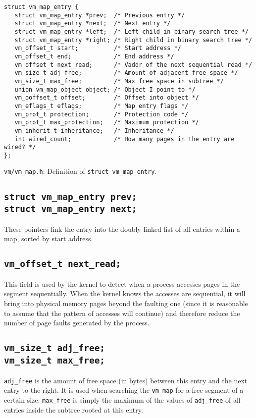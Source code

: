\documentclass[shortabstract, english]{iithesis}
\begin{document}
\begin{listing}[H]
\begin{verbatim}
struct vm_map_entry {
   struct vm_map_entry *prev;  /* Previous entry */
   struct vm_map_entry *next;  /* Next entry */
   struct vm_map_entry *left;  /* Left child in binary search tree */
   struct vm_map_entry *right; /* Right child in binary search tree */
   vm_offset_t start;          /* Start address */
   vm_offset_t end;            /* End address */
   vm_offset_t next_read;      /* Vaddr of the next sequential read */
   vm_size_t adj_free;         /* Amount of adjacent free space */
   vm_size_t max_free;         /* Max free space in subtree */
   union vm_map_object object; /* Object I point to */
   vm_ooffset_t offset;        /* Offset into object */
   vm_eflags_t eflags;         /* Map entry flags */
   vm_prot_t protection;       /* Protection code */
   vm_prot_t max_protection;   /* Maximum protection */
   vm_inherit_t inheritance;   /* Inheritance */
   int wired_count;            /* How many pages in the entry are wired? */
};
\end{verbatim}
\caption{\texttt{vm/vm\_map.h}: Definition of \texttt{struct vm_map_entry}.}
\end{listing}

\subsection*{\texttt{struct vm_map_entry prev;}\\
  \texttt{struct vm_map_entry next;}}
These pointers link the entry into the doubly linked list of all entries within
a map, sorted by start address.

\subsection*{\texttt{vm_offset_t next_read;}}
This field is used by the kernel to detect when a process accesses pages in the
segment sequentially. When the kernel knows the accesses are sequential, it will
bring into physical memory pages beyond the faulting one (since it is reasonable
to assume that the pattern of accesses will continue) and therefore reduce the
number of page faults generated by the process.

\subsection*{\texttt{vm_size_t adj_free;}\\
  \texttt{vm_size_t max_free;}}
\texttt{adj_free} is the amount of free space (in bytes) between this
entry and the next entry to the right. It is used when searching the
\texttt{vm_map} for a free segment of a certain size.
\texttt{max_free} is simply the maximum of the values of
\texttt{adj_free} of all entries inside the subtree rooted at this entry.
\end{document}
